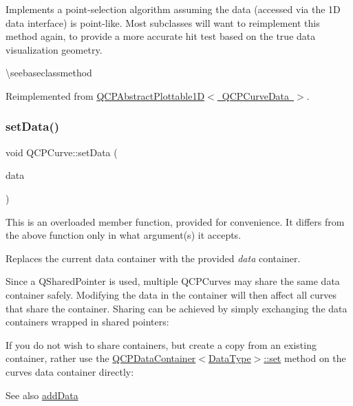 Implements a point-\/selection algorithm assuming the data (accessed via the 1D data interface) is point-\/like. Most subclasses will want to reimplement this method again, to provide a more accurate hit test based on the true data visualization geometry.

\textbackslash{}seebaseclassmethod 

Reimplemented from \mbox{\hyperlink{class_q_c_p_abstract_plottable1_d_a4611b43bcb6441b2154eb4f4e0a33db2}{Q\+C\+P\+Abstract\+Plottable1\+D$<$ Q\+C\+P\+Curve\+Data $>$}}.

\mbox{\label{class_q_c_p_curve_a41246850d2e080bc57183ca19cd4135e}} 
\subsubsection{\texorpdfstring{setData()}{setData()}\hspace{0.1cm}{\footnotesize\ttfamily [1/3]}}
{\footnotesize\ttfamily void Q\+C\+P\+Curve\+::set\+Data (\begin{DoxyParamCaption}\item[{Q\+Shared\+Pointer$<$ \mbox{\hyperlink{qcustomplot_8h_aaeee80d5664ea91beb9d7968790d0e65}{Q\+C\+P\+Curve\+Data\+Container}} $>$}]{data }\end{DoxyParamCaption})}

This is an overloaded member function, provided for convenience. It differs from the above function only in what argument(s) it accepts.

Replaces the current data container with the provided {\itshape data} container.

Since a Q\+Shared\+Pointer is used, multiple Q\+C\+P\+Curves may share the same data container safely. Modifying the data in the container will then affect all curves that share the container. Sharing can be achieved by simply exchanging the data containers wrapped in shared pointers\+: 
\begin{DoxyCodeInclude}{0}
\end{DoxyCodeInclude}
 If you do not wish to share containers, but create a copy from an existing container, rather use the \mbox{\hyperlink{class_q_c_p_data_container_ae7042bd534fc3ce7befa2ce3f790b5bf}{Q\+C\+P\+Data\+Container$<$\+Data\+Type$>$\+::set}} method on the curve\textquotesingle{}s data container directly\+: 
\begin{DoxyCodeInclude}{0}
\end{DoxyCodeInclude}
 \begin{DoxySeeAlso}{See also}
\mbox{\hyperlink{class_q_c_p_curve_a73edf394b94f3f24f07518e30565a07f}{add\+Data}} 
\end{DoxySeeAlso}
\mbox{\label{class_q_c_p_curve_a0768af2c33c8dcffa3cf5bdeb53923a6}} 
